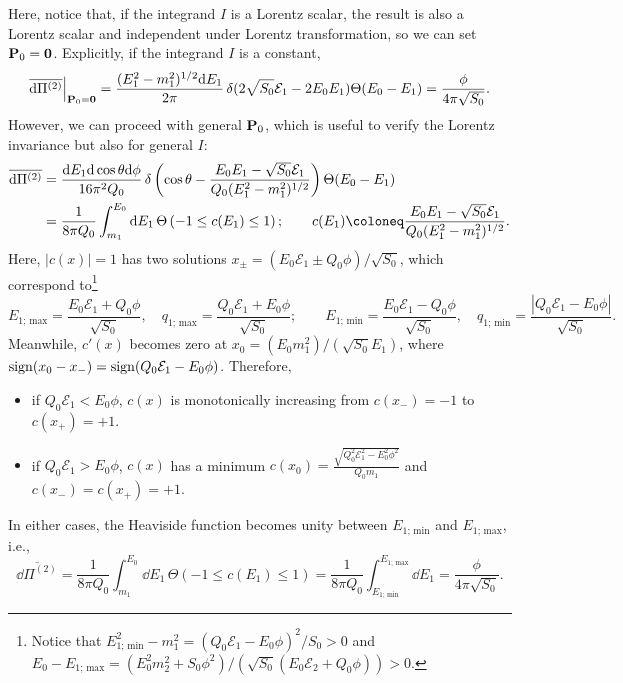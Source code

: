 \documentclass[CheatSheet]{subfiles}
\begin{document}
Here, notice that, if the integrand $I$ is a Lorentz scalar, the result is also a Lorentz scalar and independent under Lorentz transformation, so we can set ${\mathbf{P}}_0={\mathbf{0}}$. Explicitly, if the integrand $I$ is a constant,
\begin{equation}
 \overline{\dd\Pi^{(2)}}\Big|_{\vc P_0=\vc 0}
  =
   \frac{(E_1^2-m_1^2)^{1/2}\dd E_1}{2\pi}
  \diracdelta(2\sqrt{S_0}\mathcal E_1-2E_0E_1)\Theta(E_0-E_1)
  =
   \frac{\phi}{4\pi\sqrt{S_0}}.
\end{equation}
However, we can proceed with general ${\mathbf{P}}_0$, which is useful to verify the Lorentz invariance but also for general $I$:
\begin{align}
 \overline{\dd\Pi^{(2)}}
  &= \frac{\dd E_1\dd\cos\theta\dd\phi}{16\pi^2 Q_0}
  \diracdelta\left(\cos\theta-\frac{E_0E_1-\sqrt{S_0}\mathcal E_1}{Q_0(E_1^2-m_1^2)^{1/2}}\right)\Theta(E_0-E_1)
\\&=
   \frac{1}{8\pi Q_0}\int_{m_1}^{E_0}{\dd E_1}\,
  \Theta\left(-1\le c(E_1)\le1\right);\qquad
  c(E_1)\coloneq \frac{E_0E_1-\sqrt{S_0}\mathcal E_1}{Q_0(E_1^2-m_1^2)^{1/2}}.
\end{align}
Here, $|c(x)|=1$ has two solutions $x_\pm=(E_0\mathcal E_1\pm Q_0\phi)/\sqrt{S_0}$, which correspond to\footnote{%
  Notice that $E_{\text{1; min}}^2-m_1^2=(Q_0\mathcal E_1-E_0\phi)^2/S_0>0$
  and
$E_0-E_{\text{1; max}}=(E_0^2m_2^2+S_0\phi^2)/(\sqrt{S_0}(E_0\mathcal E_2+Q_0\phi))>0$.
}
\begin{equation}
  E_{\text{1; max}}=\frac{E_0\mathcal E_1+Q_0\phi}{\sqrt {S_0}},\quad
  q_{\text{1; max}}=\frac{Q_0\mathcal E_1+E_0\phi}{\sqrt{S_0}};\qquad
  E_{\text{1; min}}=\frac{E_0\mathcal E_1-Q_0\phi}{\sqrt {S_0}},\quad
  q_{\text{1; min}}=\frac{\left|Q_0\mathcal E_1-E_0\phi\right|}{\sqrt{S_0}}.
\end{equation}
Meanwhile, $c'(x)$ becomes zero at $x_0=(E_0 m_1^2)/(\sqrt {S_0}E_1)$, where $\operatorname{\mathrm{sign}}(x_0-x_-)=\operatorname{\mathrm{sign}}(Q_0 \mathcal E_1-E_0\phi)$.
Therefore,
\begin{itemize}
  \item if $Q_0 \mathcal E_1<E_0\phi$, $c(x)$ is monotonically increasing from $c(x_-)=-1$ to $c(x_+)=+1$.
  \item if $Q_0 \mathcal E_1>E_0\phi$, $c(x)$ has a minimum $\displaystyle c(x_0)=\frac{\sqrt{Q_0^2\mathcal E_1^2-E_0^2\phi^2}}{Q_0m_1}$ and $c(x_-)=c(x_+)=+1$.
\end{itemize}
In either cases, the Heaviside function becomes unity between $E_{\text{1; min}}$ and $E_{\text{1; max}}$, i.e.,
\begin{equation}
 \overline{\dd\Pi^{(2)}}
= \frac{1}{8\pi Q_0}\int_{m_1}^{E_0}{\dd E_1}\,
  \Theta\left(-1\le c(E_1)\le1\right)
= \frac{1}{8\pi Q_0}\int_{E_{\text{1; min}}}^{E_{\text{1; max}}}{\dd E_1}
= \frac{\phi}{4\pi \sqrt{S_0}}.
\end{equation}
\end{document}
